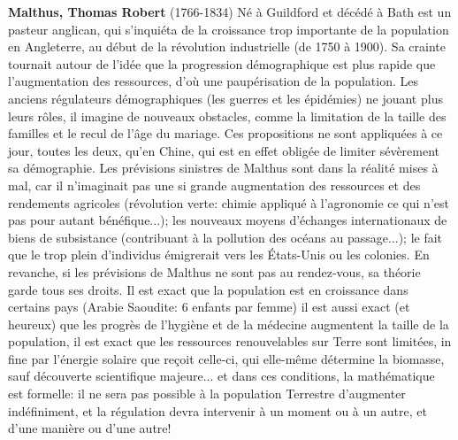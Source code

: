\textbf{Malthus, Thomas Robert} (1766-1834) Né à Guildford et décédé à Bath est un pasteur anglican, qui s'inquiéta de la croissance trop importante de la population en Angleterre, au début de la révolution industrielle (de 1750 à 1900). Sa crainte tournait autour de l'idée que la progression démographique est plus rapide que l'augmentation des ressources, d'où une paupérisation de la population. Les anciens régulateurs démographiques (les guerres et les épidémies) ne jouant plus leurs rôles, il imagine de nouveaux obstacles, comme la limitation de la taille des familles et le recul de l'âge du mariage. Ces propositions ne sont appliquées à ce jour, toutes les deux, qu'en Chine, qui est en effet obligée de limiter sévèrement sa démographie. Les prévisions sinistres de Malthus sont dans la réalité mises à mal, car il n'imaginait pas une si grande augmentation des ressources et des rendements agricoles (révolution verte: chimie appliqué à l'agronomie ce qui n'est pas pour autant bénéfique...); les nouveaux moyens d'échanges internationaux de biens de subsistance (contribuant à la pollution des océans au passage...); le fait que le trop plein d'individus émigrerait vers les États-Unis ou les colonies. En revanche, si les prévisions de Malthus ne sont pas au rendez-vous, sa théorie garde tous ses droits. Il est exact que la population est en croissance dans certains pays (Arabie Saoudite: 6 enfants par femme) il est aussi exact (et heureux) que les progrès de l'hygiène et de la médecine augmentent la taille de la population, il est exact que les ressources renouvelables sur Terre sont limitées, in fine par l'énergie solaire que reçoit celle-ci, qui elle-même détermine la biomasse, sauf découverte scientifique majeure... et dans ces conditions, la mathématique est formelle: il ne sera pas possible à la population Terrestre d'augmenter indéfiniment, et la régulation devra intervenir à un moment ou à un autre, et d'une manière ou d'une autre!

